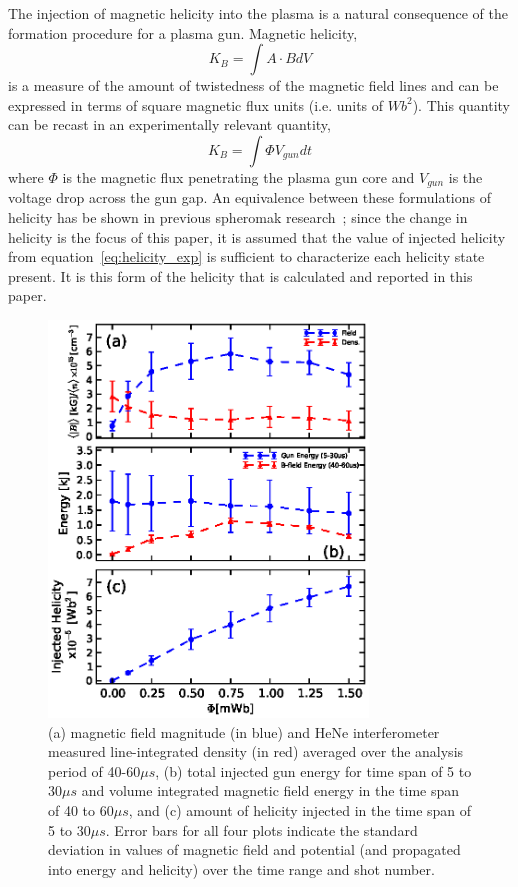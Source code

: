 \documentclass[aps,prl,amsmath,amssymb,reprint,superscriptaddress]{revtex4-1} %
\begin{document}
The injection of magnetic helicity into the plasma is a natural consequence of the formation procedure for a plasma gun. Magnetic helicity,
%
\begin{equation}
K_{B} = \int A \cdot B dV
\label{eq:helicity_th}
\end{equation}
%
is a measure of the amount of twistedness of the magnetic field lines and can be expressed in terms of square magnetic flux units (i.e. units of $Wb^{2}$). This quantity can be recast in an experimentally relevant quantity, 
%
\begin{equation}
K_{B} = \int \Phi V_{gun} dt
\label{eq:helicity_exp}
\end{equation}
%
where $\Phi$ is the magnetic flux penetrating the plasma gun core and $V_{gun}$ is the voltage drop across the gun gap. An equivalence between these formulations of helicity has be shown in previous spheromak research~\cite{barnes86}; since the change in helicity is the focus of this paper, it is assumed that the value of injected helicity from equation~\ref{eq:helicity_exp} is sufficient to characterize each helicity state present. It is this form of the helicity that is calculated and reported in this paper.

\begin{figure}[!htbp]
\centerline{
\includegraphics[width=8.5cm]{figure1.eps}}
\caption{\label{fig:helicity_scaling} (a) magnetic field magnitude (in blue) and HeNe interferometer measured line-integrated density (in red) averaged over the analysis period of 40-60$\mu s$, (b) total injected gun energy for time span of 5 to 30$\mu s$ and volume integrated magnetic field energy in the time span of 40 to 60$\mu s$, and (c) amount of helicity injected in the time span of 5 to 30$\mu s$. Error bars for all four plots indicate the standard deviation in values of magnetic field and potential (and propagated into energy and helicity) over the time range and shot number.}
\end{figure}
\end{document}
